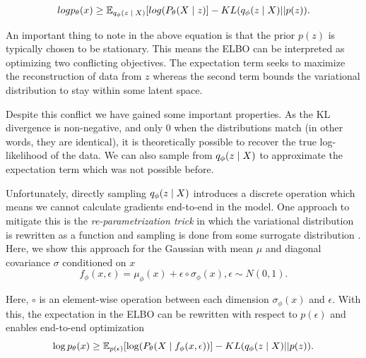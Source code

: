 \begin{equation}
	log p_{\theta}(x) \geq \operatorname{\mathbb{E}}_{q_{\phi}(z \; | \;{X})} [ log(P_{\theta}(X \; | \;{z}) ]  - KL(q_{\phi}(z \; | \;{X}) || p(z)).
\end{equation}

An important thing to note in the above equation is that the prior $p(z)$ is typically chosen to be stationary. This means the \ac{ELBO} can be interpreted as optimizing two conflicting objectives. The expectation term seeks to maximize the reconstruction of data from $z$ whereas the second term bounds the variational distribution to stay within some latent space.

Despite this conflict we have gained some important properties. As the KL divergence is non-negative, and only 0 when the distributions match (in other words, they are identical), it is theoretically possible to recover the true log-likelihood of the data. We can also sample from $q_{\phi}(z \; | \;{X})$ to approximate the expectation term which was not possible before.

Unfortunately, directly sampling $q_{\phi}(z \; | \;{X})$ introduces a discrete operation which means we cannot calculate gradients end-to-end in the model. One approach to mitigate this is the \textit{re-parametrization trick} in which the variational distribution  is rewritten as a function and sampling is done from some surrogate  distribution \cite{kingma2014autoencodingVB,rezende2014stochasticBackprop} . Here, we show this approach for the Gaussian with mean $\mu$ and diagonal covariance $\sigma$ conditioned on $x$
\begin{equation}
f_{\phi}(x, \epsilon) = \mu_{\phi}(x) + \epsilon \circ \sigma_{\phi}(x), \epsilon \sim N(0, 1).
\end{equation}

Here, $\circ$ is an element-wise operation between each dimension $\sigma_{\phi}(x)$ and $\epsilon$. With this, the expectation in the \ac{ELBO} can be rewritten with respect to $p(\epsilon)$ and enables end-to-end optimization 
\begin{equation}
\log p_{\theta}(x) \geq \operatorname{\mathbb{E}}_{p(\epsilon) } [ \log(P_{\theta}(X \; | \;{f_{\phi}(x, \epsilon)}) ]  - KL(q_{\phi}(z \; | \;{X}) || p(z)).
\end{equation}






